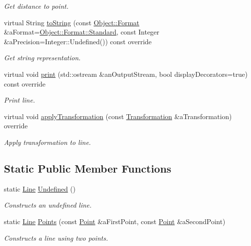 \begin{DoxyCompactItemize}
\begin{DoxyCompactList}\small\item\em Get distance to point. \end{DoxyCompactList}\item 
virtual String \hyperlink{classostk_1_1math_1_1geom_1_1d2_1_1objects_1_1_line_a8b7e13b51e64b9db157ee08a5310646f}{to\+String} (const \hyperlink{classostk_1_1math_1_1geom_1_1d2_1_1_object_aa76f9e30caebf4005bafbdff447f66cf}{Object\+::\+Format} \&a\+Format=\hyperlink{classostk_1_1math_1_1geom_1_1d2_1_1_object_aa76f9e30caebf4005bafbdff447f66cfaeb6d8ae6f20283755b339c0dc273988b}{Object\+::\+Format\+::\+Standard}, const Integer \&a\+Precision=Integer\+::\+Undefined()) const override
\begin{DoxyCompactList}\small\item\em Get string representation. \end{DoxyCompactList}\item 
virtual void \hyperlink{classostk_1_1math_1_1geom_1_1d2_1_1objects_1_1_line_a8bd64cd001e4c05e3cdf7ebd7e520cb7}{print} (std\+::ostream \&an\+Output\+Stream, bool display\+Decorators=true) const override
\begin{DoxyCompactList}\small\item\em Print line. \end{DoxyCompactList}\item 
virtual void \hyperlink{classostk_1_1math_1_1geom_1_1d2_1_1objects_1_1_line_a75088e717153954f56cdd2df2087bdb6}{apply\+Transformation} (const \hyperlink{classostk_1_1math_1_1geom_1_1d2_1_1_transformation}{Transformation} \&a\+Transformation) override
\begin{DoxyCompactList}\small\item\em Apply transformation to line. \end{DoxyCompactList}\end{DoxyCompactItemize}
\subsection*{Static Public Member Functions}
\begin{DoxyCompactItemize}
\item 
static \hyperlink{classostk_1_1math_1_1geom_1_1d2_1_1objects_1_1_line}{Line} \hyperlink{classostk_1_1math_1_1geom_1_1d2_1_1objects_1_1_line_a972021efa1daf10a576115b1b74614f0}{Undefined} ()
\begin{DoxyCompactList}\small\item\em Constructs an undefined line. \end{DoxyCompactList}\item 
static \hyperlink{classostk_1_1math_1_1geom_1_1d2_1_1objects_1_1_line}{Line} \hyperlink{classostk_1_1math_1_1geom_1_1d2_1_1objects_1_1_line_a572c81bd8c94574a0f7d53fc5578daa4}{Points} (const \hyperlink{classostk_1_1math_1_1geom_1_1d2_1_1objects_1_1_point}{Point} \&a\+First\+Point, const \hyperlink{classostk_1_1math_1_1geom_1_1d2_1_1objects_1_1_point}{Point} \&a\+Second\+Point)
\begin{DoxyCompactList}\small\item\em Constructs a line using two points. \end{DoxyCompactList}\end{DoxyCompactItemize}
